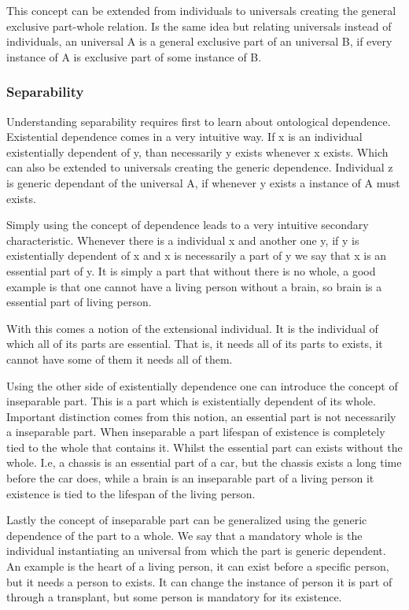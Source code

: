 This concept can be extended from individuals to universals creating the general exclusive part-whole relation. Is the same idea but relating universals instead of individuals, an universal A is a general exclusive part of an universal B, if every instance of A is exclusive part of some instance of B.

\subsubsection{Separability}

Understanding separability requires first to learn about ontological dependence. Existential dependence comes in a very intuitive way. If x is an individual existentially dependent of y, than necessarily y exists whenever x exists. Which can also be extended to universals creating the generic dependence. Individual z is generic dependant of the universal A, if whenever y exists a instance of A must exists.

Simply using the concept of dependence leads to a very intuitive secondary characteristic. Whenever there is a individual x and another one y, if y is existentially dependent of x and x is necessarily a part of y we say that x is an essential part of y. It is simply a part that without there is no whole, a good example is that one cannot have a living person without a brain, so brain is a essential part of living person. 

With this comes a notion of the extensional individual. It is the individual of which all of its parts are essential. That is, it needs all of its parts to exists, it cannot have some of them it needs all of them.

Using the other side of existentially dependence one can introduce the concept of inseparable part. This is a part which is existentially dependent of its whole. Important distinction comes from this notion, an essential part is not necessarily a inseparable part. When inseparable a part lifespan of existence is completely tied to the whole that contains it. Whilst the essential part can exists without the whole. I.e, a chassis is an essential part of a car, but the chassis exists a long time before the car does, while a brain is an inseparable part of a living person it existence is tied to the lifespan of the living person.

Lastly the concept of inseparable part can be generalized using the generic dependence of the part to a whole. We say that a mandatory whole is the individual instantiating an universal from which the part is generic dependent. An example is the heart of a living person, it can exist before a specific person, but it needs a person to exists. It can change the instance of person it is part of through a transplant, but some person is mandatory for its existence.

